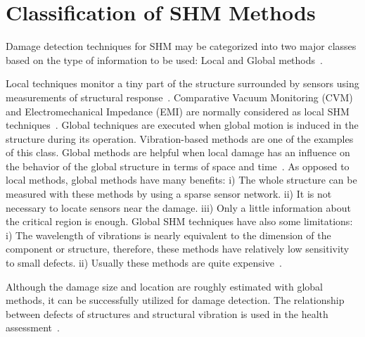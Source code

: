 \documentclass[b5paper, 11pt, titlepage]{book}
\begin{document}
\section{Classification of SHM Methods}
Damage detection techniques for SHM may be categorized into two major classes based on the type of information to be used: Local and Global methods~\cite{lee2008overview, stepinski2013advanced}. 

Local techniques monitor a tiny part of the structure surrounded by sensors using measurements of structural response~\cite{lee2008overview, stepinski2013advanced}. Comparative Vacuum Monitoring (CVM) and Electromechanical Impedance (EMI) are normally considered as local SHM techniques~\cite{Guemes2020a, liang1997coupled, Fiborek2018}.
\newline Global techniques are executed when global motion is induced in the structure during its operation. Vibration-based methods are one of the examples of this class. Global methods are helpful when local damage has an influence on the behavior of the global structure in terms of space and time~\cite{lee2008overview, stepinski2013advanced}. 
As opposed to local methods, global methods have many benefits: 
\newline i) The whole structure can be measured with these methods by using a sparse sensor network.
\newline ii) It is not necessary to locate sensors near the damage.
\newline iii) Only a little information about the critical region is enough. 
Global SHM techniques have also some limitations: 
\newline i) The wavelength of vibrations is nearly equivalent to the dimension of the component or structure, therefore, these methods have relatively low sensitivity to small defects. 
\newline ii) Usually these methods are quite expensive~\cite{ stepinski2013advanced}.

Although the damage size and location are roughly estimated with global methods, it can be successfully utilized for damage detection. The relationship between defects of structures and structural vibration is used in the health assessment~\cite{stepinski2013advanced,Worden2007}. 
\end{document}
